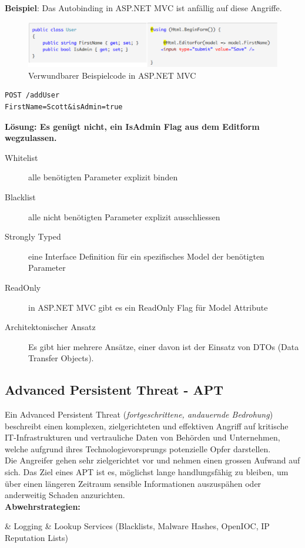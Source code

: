 \textbf{Beispiel}: Das Autobinding in ASP.NET MVC ist anfällig auf diese Angriffe.
\begin{figure}[H]
	\centering
	\includegraphics[width=\textwidth]{./img/mass-assignment-vulnerability}
	\caption{Verwundbarer Beispielcode in ASP.NET MVC}
\end{figure}
\begin{lstlisting}[language={},caption=Beispiel eines präparierten Requests zum Setzen eines nicht vorgesehenen Parameters]
POST /addUser
FirstName=Scott&isAdmin=true
\end{lstlisting}

\textbf{Lösung: Es genügt nicht, ein IsAdmin Flag aus dem Editform wegzulassen.}

\begin{description}
	\item[Whitelist] alle benötigten Parameter explizit binden
	\item[Blacklist] alle nicht benötigten Parameter explizit ausschliessen
	\item[Strongly Typed] eine Interface Definition für ein spezifisches Model der benötigten Parameter
	\item[ReadOnly] in ASP.NET MVC gibt es ein ReadOnly Flag für Model Attribute
	\item[Architektonischer Ansatz] Es gibt hier mehrere Ansätze, einer davon ist der Einsatz von DTOs (Data Transfer Objects).
\end{description}

\subsection{Advanced Persistent Threat - APT}
Ein Advanced Persistent Threat (\textit{fortgeschrittene, andauernde Bedrohung}) beschreibt einen komplexen, zielgerichteten und effektiven Angriff auf kritische IT-Infrastrukturen und vertrauliche Daten von Behörden und Unternehmen, welche aufgrund ihres Technologievorsprungs potenzielle Opfer darstellen.\\
Die Angreifer gehen sehr zielgerichtet vor und nehmen einen grossen Aufwand auf sich. Das Ziel eines APT ist es, möglichst lange handlungsfähig zu bleiben, um über einen längeren Zeitraum sensible Informationen auszuspähen oder anderweitig Schaden anzurichten.\\
\textbf{Abwehrstrategien:}
\begin{easylist}
	& Logging
	& Lookup Services (Blacklists, Malware Hashes, OpenIOC, IP Reputation Lists)
\end{easylist}
